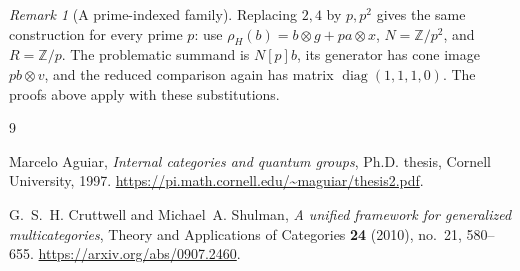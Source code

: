 \documentclass[11pt,a4paper]{article}
\theoremstyle{definition}
\theoremstyle{remark}
\newtheorem{remark}[theorem]{Remark}
\numberwithin{equation}{section}
\newcommand{\Z}{\mathbb Z}
\begin{document}
\begin{remark}[A prime-indexed family]
Replacing $2,4$ by $p,p^2$ gives the same construction for every prime
$p$: use $\rho_H(b)=b\otimes g+pa\otimes x$, $N=\Z/p^2$, and
$R=\Z/p$. The problematic summand is $N[p]b$, its generator has
cone image $pb\otimes v$, and the reduced comparison again has matrix
$\operatorname{diag}(1,1,1,0)$. The proofs above apply with these
substitutions.
\end{remark}

\begin{thebibliography}{9}

Marcelo Aguiar,
\emph{Internal categories and quantum groups},
Ph.D. thesis, Cornell University, 1997.
\url{https://pi.math.cornell.edu/~maguiar/thesis2.pdf}.

G.~S.~H. Cruttwell and Michael~A. Shulman,
\emph{A unified framework for generalized multicategories},
Theory and Applications of Categories \textbf{24} (2010), no.~21,
580--655.
\url{https://arxiv.org/abs/0907.2460}.

\end{thebibliography}
\end{document}
